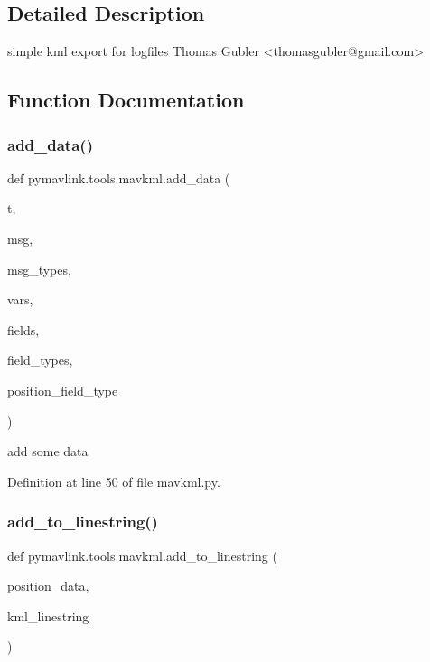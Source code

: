 \subsection{Detailed Description}
\begin{DoxyVerb}simple kml export for logfiles
Thomas Gubler <thomasgubler@gmail.com>
\end{DoxyVerb}
 

\subsection{Function Documentation}
\mbox{\label{namespacepymavlink_1_1tools_1_1mavkml_a356af6d8a50929dbc97b578a26b02c89}} 
\subsubsection{\texorpdfstring{add\_data()}{add\_data()}}
{\footnotesize\ttfamily def pymavlink.\+tools.\+mavkml.\+add\+\_\+data (\begin{DoxyParamCaption}\item[{}]{t,  }\item[{}]{msg,  }\item[{}]{msg\+\_\+types,  }\item[{}]{vars,  }\item[{}]{fields,  }\item[{}]{field\+\_\+types,  }\item[{}]{position\+\_\+field\+\_\+type }\end{DoxyParamCaption})}

\begin{DoxyVerb}add some data\end{DoxyVerb}
 

Definition at line 50 of file mavkml.\+py.

\mbox{\label{namespacepymavlink_1_1tools_1_1mavkml_abf0b47cf026ca292449dfdc677ca6fd0}} 
\subsubsection{\texorpdfstring{add\_to\_linestring()}{add\_to\_linestring()}}
{\footnotesize\ttfamily def pymavlink.\+tools.\+mavkml.\+add\+\_\+to\+\_\+linestring (\begin{DoxyParamCaption}\item[{}]{position\+\_\+data,  }\item[{}]{kml\+\_\+linestring }\end{DoxyParamCaption})}

